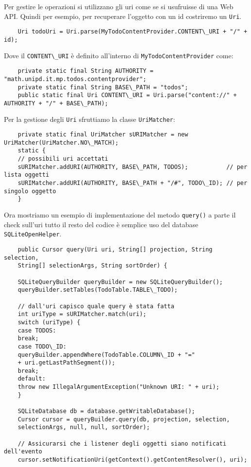 \begin{itemize}
	Per gestire le operazioni si utilizzano gli uri come se si usufruisse di una Web API. Quindi per esempio, per recuperare l'oggetto con un id costriremo un \lstinline|Uri|.
	\begin{lstlisting}
	Uri todoUri = Uri.parse(MyTodoContentProvider.CONTENT\_URI + "/" + id);
	\end{lstlisting}
	
	Dove il \lstinline|CONTENT\_URI| è definito all'interno di \lstinline|MyTodoContentProvider| come:
	\begin{lstlisting}
	private static final String AUTHORITY = "math.unipd.it.mp.todos.contentprovider";
	private static final String BASE\_PATH = "todos";
	public static final Uri CONTENT\_URI = Uri.parse("content://" + AUTHORITY + "/" + BASE\_PATH);
	\end{lstlisting}
	
	Per la gestione degli \lstinline|Uri| sfruttiamo la classe \lstinline|UriMatcher|:
	\begin{lstlisting}
	private static final UriMatcher sURIMatcher = new UriMatcher(UriMatcher.NO\_MATCH);
	static {
	// possibili uri accettati
	sURIMatcher.addURI(AUTHORITY, BASE\_PATH, TODOS);			// per lista oggetti
	sURIMatcher.addURI(AUTHORITY, BASE\_PATH + "/#", TODO\_ID);	// per singolo oggetto
	}
	\end{lstlisting}
	
	Ora mostriamo un esempio di implementazione del metodo \lstinline|query()| a parte il check sull'uri tutto il resto del codice è semplice uso del database \lstinline|SQLiteOpenHelper|.
	\begin{lstlisting}
	public Cursor query(Uri uri, String[] projection, String selection,
	String[] selectionArgs, String sortOrder) {
	
	SQLiteQueryBuilder queryBuilder = new SQLiteQueryBuilder();
	queryBuilder.setTables(TodoTable.TABLE\_TODO);
	
	// dall'uri capisco quale query è stata fatta
	int uriType = sURIMatcher.match(uri);	
	switch (uriType) {
	case TODOS:
	break;
	case TODO\_ID:
	queryBuilder.appendWhere(TodoTable.COLUMN\_ID + "="
	+ uri.getLastPathSegment());
	break;
	default:
	throw new IllegalArgumentException("Unknown URI: " + uri);
	}
	
	SQLiteDatabase db = database.getWritableDatabase();
	Cursor cursor = queryBuilder.query(db, projection, selection,
	selectionArgs, null, null, sortOrder);
	
	// Assicurarsi che i listener degli oggetti siano notificati dell'evento
	cursor.setNotificationUri(getContext().getContentResolver(), uri);
	

\end{lstlisting}
\end{itemize}
